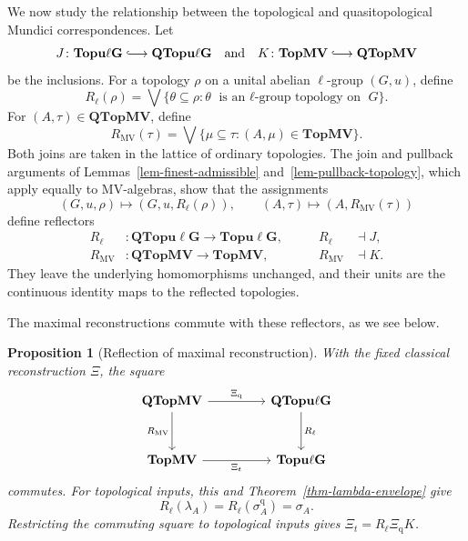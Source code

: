 \documentclass[preprint,3p]{elsarticle}
\theoremstyle{plain}
\newtheorem{prop}[thm]{Proposition}
\theoremstyle{definition}
\newcommand{\longhookrightarrow}{\lhook\joinrel\longrightarrow}
\newcommand{\TopMV}{\mathbf{TopMV}}
\newcommand{\Topulg}{\mathbf{Topu\ell G}}
\newcommand{\QTopMV}{\mathbf{QTopMV}}
\newcommand{\QTopulg}{\mathbf{QTopu\ell G}}
\numberwithin{equation}{section}
\begin{document}
We now study the relationship between the topological and
quasitopological Mundici correspondences.  Let
\[
 J\colon\Topulg\longhookrightarrow\QTopulg
 \quad\text{and}\quad
 K\colon\TopMV\longhookrightarrow\QTopMV
\]
be the inclusions.  For a topology $\rho$ on a unital abelian
$\ell$-group $(G,u)$, define
\begin{equation}
\label{eq-lgroup-reflection}
 R_\ell(\rho)=\bigvee\{\theta\subseteq\rho:
                   \theta\text{ is an $\ell$-group topology on }G\}.
\end{equation}
For $(A,\tau)\in\QTopMV$, define
\begin{equation}
\label{eq-MV-reflection}
 R_{\mathrm{MV}}(\tau)
 =\bigvee\{\mu\subseteq\tau:(A,\mu)\in\TopMV\}.
\end{equation}
Both joins are taken in the lattice of ordinary topologies.
The join and pullback arguments of
Lemmas~\ref{lem-finest-admissible} and~\ref{lem-pullback-topology},
which apply equally to MV-algebras, show that the assignments
\[
 (G,u,\rho)\mapsto(G,u,R_\ell(\rho)),\qquad (A,\tau)\mapsto(A,R_{\mathrm{MV}}(\tau))
\]
define reflectors
\[
 \begin{aligned}
  R_\ell&\colon\QTopulg\longrightarrow\Topulg,
  &\qquad R_\ell&\dashv J,\\
  R_{\mathrm{MV}}&\colon\QTopMV\longrightarrow\TopMV,
  &\qquad R_{\mathrm{MV}}&\dashv K.
 \end{aligned}
\]
They leave the underlying homomorphisms unchanged, and their units
are the continuous identity maps to the reflected topologies.

The maximal reconstructions commute with these reflectors,
as we see below.

\begin{prop}[Reflection of maximal reconstruction]
\label{thm-quasi-reflection-factorization}
With the fixed classical reconstruction $\Xi$, the square
\begin{equation}
\label{eq-reflection-square}
\begin{tikzcd}[column sep=4.5em,row sep=3em]
 \QTopMV \arrow[r,"\Xi_{\mathrm q}"] \arrow[d,"R_{\mathrm{MV}}"']
 & \QTopulg \arrow[d,"R_\ell"] \\
 \TopMV \arrow[r,"\Xi_t"'] & \Topulg
\end{tikzcd}
\end{equation}
commutes. For topological inputs, this and
Theorem~\ref{thm-lambda-envelope} give
\begin{equation}
\label{eq-quasi-reflection-topologies}
 R_\ell(\lambda_A)=R_\ell(\sigma_A^{\mathrm q})=\sigma_A.
\end{equation}
Restricting the commuting square to topological inputs gives
$\Xi_t=R_\ell\Xi_{\mathrm q}K$.
\end{prop}
\end{document}
